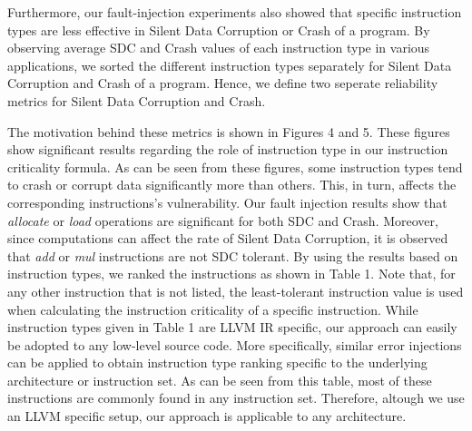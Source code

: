 Furthermore, our fault-injection experiments also showed that specific instruction types are less effective in Silent Data Corruption or Crash of a program. By observing average SDC and Crash values of each instruction type in various applications, we sorted the different instruction types separately for Silent Data Corruption and Crash of a program. Hence, we define two seperate reliability metrics for Silent Data Corruption and Crash.

The motivation behind these metrics is shown in Figures 4 and 5. These figures show significant results regarding the role of instruction type in our instruction criticality formula. As can be seen from these figures, some instruction types tend to crash or corrupt data significantly more than others. This, in turn, affects the corresponding instructions's vulnerability. Our fault injection results show that \emph{allocate} or \emph{load} operations are significant for both SDC and Crash. Moreover, since computations can affect the rate of Silent Data Corruption, it is observed that \emph{add} or \emph{mul} instructions are not SDC tolerant. By using the results based on instruction types, we ranked the instructions as shown in Table 1. Note that, for any other instruction that is not listed, the least-tolerant instruction value is used when calculating the instruction criticality of a specific instruction. While instruction types given in Table 1 are LLVM IR specific, our approach can easily be adopted to any low-level source code. More specifically, similar error injections can be applied to obtain instruction type ranking specific to the underlying architecture or instruction set. As can be seen from this table, most of these instructions are commonly found in any instruction set. Therefore, altough we use an LLVM specific setup, our approach is applicable to any architecture.

